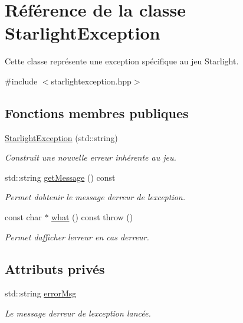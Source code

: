 \hypertarget{classStarlightException}{}\section{Référence de la classe Starlight\+Exception}
\label{classStarlightException}


Cette classe représente une exception spécifique au jeu Starlight.  




{\ttfamily \#include $<$starlightexception.\+hpp$>$}

\subsection*{Fonctions membres publiques}
\begin{DoxyCompactItemize}
\item 
\hyperlink{classStarlightException_a36d43a3c21c61b15a8dc4b3e15f12ab0}{Starlight\+Exception} (std\+::string)
\begin{DoxyCompactList}\small\item\em Construit une nouvelle erreur inhérente au jeu. \end{DoxyCompactList}\item 
std\+::string \hyperlink{classStarlightException_ae4c499f366c74c29dc36c935aa665dda}{get\+Message} () const 
\begin{DoxyCompactList}\small\item\em Permet d\textquotesingle{}obtenir le message d\textquotesingle{}erreur de l\textquotesingle{}exception. \end{DoxyCompactList}\item 
const char $\ast$ \hyperlink{classStarlightException_a727446aaf06aa9bc92d63ff21a37049b}{what} () const   throw ()
\begin{DoxyCompactList}\small\item\em Permet d\textquotesingle{}afficher l\textquotesingle{}erreur en cas d\textquotesingle{}erreur. \end{DoxyCompactList}\end{DoxyCompactItemize}
\subsection*{Attributs privés}
\begin{DoxyCompactItemize}
\item 
std\+::string \hyperlink{classStarlightException_aa235f0c10c5ad918b0c2911c72a85fcb}{error\+Msg}
\begin{DoxyCompactList}\small\item\em Le message d\textquotesingle{}erreur de l\textquotesingle{}exception lancée. \end{DoxyCompactList}\end{DoxyCompactItemize}


